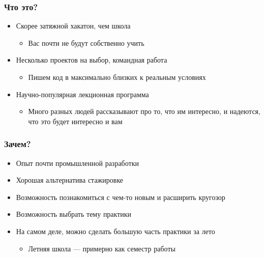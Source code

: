 \documentclass{../../slides-style}
\begin{document}
    \begin{frame}[plain]
        \titlepage
    \end{frame}

    \begin{frame}
        \frametitle{Что это?}
        \begin{itemize}
            \item Скорее затяжной хакатон, чем школа
            \begin{itemize}
                \item Вас почти не будут собственно учить
            \end{itemize}
            \item Несколько проектов на выбор, командная работа
            \begin{itemize}
                \item Пишем код в максимально близких к реальным условиях
            \end{itemize}
            \item Научно-популярная лекционная программа
            \begin{itemize}
                \item Много разных людей рассказывают про то, что им интересно, и надеются, что это будет интересно и вам
            \end{itemize}
        \end{itemize}
    \end{frame}

    \begin{frame}
        \frametitle{Зачем?}
        \begin{itemize}
            \item Опыт почти промышленной разработки
            \item Хорошая альтернатива стажировке
            \item Возможность познакомиться с чем-то новым и расширить кругозор
            \item Возможность выбрать тему практики
            \item На самом деле, можно сделать большую часть практики за лето
            \begin{itemize}
                \item Летняя школа --- примерно как семестр работы
            \end{itemize}
        \end{itemize}
    \end{frame}
\end{document}
